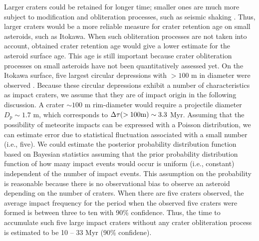 \documentclass[3p,authoryear]{elsarticle}
\begin{document}
Larger craters could be retained for longer time; smaller ones are much more subject to modification and obliteration processes, such as seismic shaking \citep[i.e.,][]{michel2009}.
Thus, larger craters would be a more reliable measure for crater retention age on small asteroids, such as Itokawa.
When such obliteration processes are not taken into account, obtained crater retention age would give a lower estimate for the asteroid surface age.
This age is still important because crater obliteration processes on small asteroids have not been quantitatively assessed yet.
On the Itokawa surface, five largest circular depressions with $>100$ m in diameter were observed \citep{hirata2009}.
Because these circular depressions exhibit a number of characteristics as impact craters, we assume that they are of impact origin in the following discussion.
A crater $\sim 100$ m rim-diameter would require a projectile diameter $D_p\sim 1.7$ m, which corresponds to $\Delta \tau (>100 \rm{m})\sim 3.3$ Myr.
Assuming that the possibility of meteorite impacts can be expressed with a Poisson distribution, we can estimate error due to statistical fluctuation associated with a small number (i.e., five). We could estimate the posterior probability distribution function based on Bayesian statistics assuming that the prior probability distribution function of how many impact events would occur is uniform (i.e., constant) independent of the number of impact events.
This assumption on the probability is reasonable because there is no observational bias to observe an asteroid depending on the number of craters.
When there are five craters observed, the average impact frequency for the period when the observed five craters were formed is between three to ten with 90\% confidence.
Thus, the time to accumulate such five large impact craters without any crater obliteration process is estimated to be 10 -- 33 Myr (90\% confidene).
\end{document}
